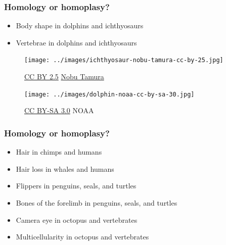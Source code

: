 \begin{frame}
    \frametitle{Homology or homoplasy?}
    \begin{itemize}
        \item<1-> Body shape in dolphins and ichthyosaurs
        \item<2-> Vertebrae in dolphins and ichthyosaurs
    \end{itemize}
    \begin{figure}
        \texttt{[image: ../images/ichthyosaur-nobu-tamura-cc-by-25.jpg]}
        \caption{\tiny \href{http://creativecommons.org/licenses/by/2.5/}{CC BY 2.5} \href{http://spinops.blogspot.com/}{Nobu Tamura}}
    \end{figure}
    \vspace{-0.7cm}
    \begin{figure}
        \texttt{[image: ../images/dolphin-noaa-cc-by-sa-30.jpg]}
        \caption{\tiny \href{http://creativecommons.org/licenses/by-sa/3.0/}{CC BY-SA 3.0} NOAA}
    \end{figure}
\end{frame}

    
\begin{frame}
    \frametitle{Homology or homoplasy?}
    \begin{itemize}
        \item Hair in chimps and humans

        \item Hair loss in whales and humans

        \item Flippers in penguins, seals, and turtles

        \item Bones of the forelimb in penguins, seals, and turtles

        \item Camera eye in octopus and vertebrates

        \item Multicellularity in octopus and vertebrates

    \end{itemize}
\end{frame}

